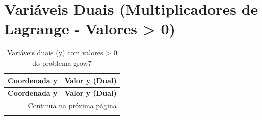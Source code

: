 \documentclass[12pt]{article}
\begin{document}
\section{Variáveis Duais (Multiplicadores de Lagrange - Valores > 0)}

\begin{longtable}{@{}cc@{}}
\caption{Variáveis duais (y) com valores > 0 do problema grow7} \\
\toprule
\textbf{Coordenada y} & \textbf{Valor y (Dual)} \\
\midrule
\endfirsthead

\toprule
\textbf{Coordenada y} & \textbf{Valor y (Dual)} \\
\midrule
\endhead

\midrule \multicolumn{2}{r}{{Continua na próxima página}} \\ \midrule
\endfoot


\end{longtable}
\end{document}
